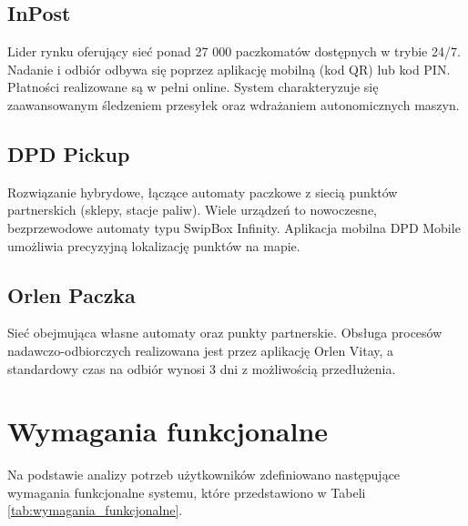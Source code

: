 \subsection{InPost}
Lider rynku oferujący sieć ponad 27 000 paczkomatów dostępnych w trybie 24/7. Nadanie i odbiór odbywa się poprzez aplikację mobilną (kod QR) lub kod PIN. Płatności realizowane są w pełni online. System charakteryzuje się zaawansowanym śledzeniem przesyłek oraz wdrażaniem autonomicznych maszyn.

\subsection{DPD Pickup}
Rozwiązanie hybrydowe, łączące automaty paczkowe z siecią punktów partnerskich (sklepy, stacje paliw). Wiele urządzeń to nowoczesne, bezprzewodowe automaty typu SwipBox Infinity. Aplikacja mobilna DPD Mobile umożliwia precyzyjną lokalizację punktów na mapie.

\subsection{Orlen Paczka}
Sieć obejmująca własne automaty oraz punkty partnerskie. Obsługa procesów nadawczo-odbiorczych realizowana jest przez aplikację Orlen Vitay, a standardowy czas na odbiór wynosi 3 dni z możliwością przedłużenia.

\section{Wymagania funkcjonalne}

Na podstawie analizy potrzeb użytkowników zdefiniowano następujące wymagania funkcjonalne systemu, które przedstawiono w Tabeli \ref{tab:wymagania_funkcjonalne}.


